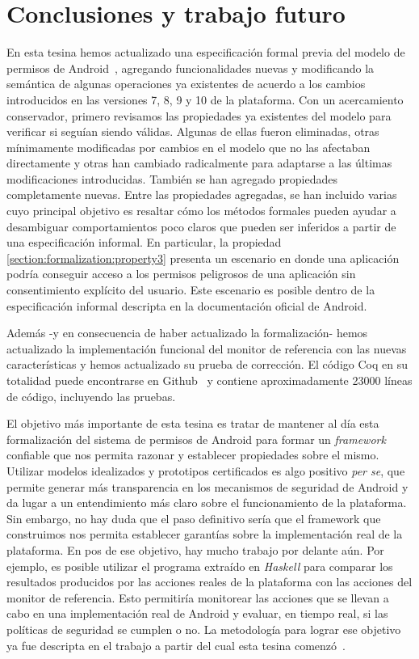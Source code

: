 \chapter{Conclusiones y trabajo futuro}
\label{chapter:conclusion}

En esta tesina hemos actualizado una especificación formal previa del modelo de permisos de
Android~\cite{luna-cleiej,betarte-2016}, agregando funcionalidades nuevas y modificando la semántica
de algunas operaciones ya existentes de acuerdo a los cambios introducidos en las versiones 7, 8, 9
y 10 de la plataforma. Con un acercamiento conservador, primero revisamos las propiedades ya
existentes del modelo para verificar si seguían siendo válidas. Algunas de ellas fueron eliminadas,
otras mínimamente modificadas por cambios en el modelo que no las afectaban directamente y otras han
cambiado radicalmente para adaptarse a las últimas modificaciones introducidas. También se han
agregado propiedades completamente nuevas. Entre las propiedades agregadas, se han incluido varias
cuyo principal objetivo es resaltar cómo los métodos formales pueden ayudar a desambiguar
comportamientos poco claros que pueden ser inferidos a partir de una especificación informal. En
particular, la propiedad \ref{section:formalization:property3} presenta un escenario en donde una
aplicación podría conseguir acceso a los permisos peligrosos de una aplicación sin consentimiento
explícito del usuario. Este escenario es posible dentro de la especificación informal descripta en
la documentación oficial de Android.

Además -y en consecuencia de haber actualizado la formalización- hemos actualizado la implementación
funcional del monitor de referencia con las nuevas características y hemos actualizado su prueba de
corrección. El código Coq en su totalidad puede encontrarse en Github~\cite{github-code} y contiene
aproximadamente 23000 líneas de código, incluyendo las pruebas.

El objetivo más importante de esta tesina es tratar de mantener al día esta formalización del
sistema de permisos de Android para formar un \textit{framework} confiable que nos permita razonar y
establecer propiedades sobre el mismo. Utilizar modelos idealizados y prototipos certificados es
algo positivo \textit{per se}, que permite generar más transparencia en los mecanismos de seguridad
de Android y da lugar a un entendimiento más claro sobre el funcionamiento de la plataforma. Sin
embargo, no hay duda que el paso definitivo sería que el framework que construimos nos permita
establecer garantías sobre la implementación real de la plataforma. En pos de ese objetivo, hay
mucho trabajo por delante aún. Por ejemplo, es posible utilizar el programa extraído en
\textit{Haskell} para comparar los resultados producidos por las acciones reales de la plataforma
con las acciones del monitor de referencia. Esto permitiría monitorear las acciones que se llevan a
cabo en una implementación real de Android y evaluar, en tiempo real, si las políticas de seguridad
se cumplen o no. La metodología para lograr ese objetivo ya fue descripta en el trabajo a partir del
cual esta tesina comenzó~\cite{luna-cleiej}.

